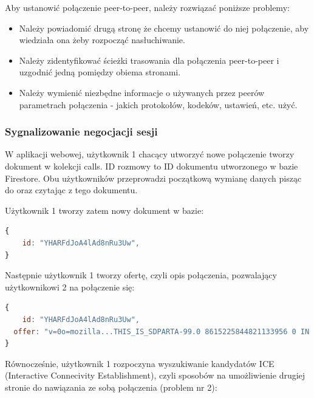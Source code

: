 Aby ustanowić połączenie peer-to-peer, należy rozwiązać poniższe problemy: \cite{hpbn}

\begin{itemize}
  \item Należy powiadomić drugą stronę że chcemy ustanowić do niej połączenie, aby wiedziała ona żeby rozpocząć
        nasłuchiwanie.
  \item Należy zidentyfikować ścieżki trasowania dla połączenia peer-to-peer i uzgodnić jedną pomiędzy obiema stronami.
  \item Należy wymienić niezbędne informacje o używanych przez peerów parametrach połączenia - jakich protokołów,
        kodeków, ustawień, etc. użyć.
\end{itemize}

\subsubsection{Sygnalizowanie negocjacji sesji}

W aplikacji webowej, użytkownik 1 chacący utworzyć nowe połączenie tworzy dokument w kolekcji calls. ID rozmowy to ID
dokumentu utworzonego w bazie Firestore. Obu użytkowników przeprowadzi początkową wymianę danych pisząc do oraz czytając
z tego dokumentu.

Użytkownik 1 tworzy zatem nowy dokument w bazie:

\begin{lstlisting}[language=Javascript,label=list:call-doc-1, caption=Dokument połączenia po utworzeniu przez użytkownika 1,
basicstyle=\footnotesize \ttfamily, showtabs=true, tabsize=4]
{
	id: "YHARFdJoA4lAd8nRu3Uw",
}
\end{lstlisting}

Następnie użytkownik 1 tworzy ofertę, czyli opis połączenia, pozwalający użytkownikowi 2 na połączenie się:

\begin{lstlisting}[language=Javascript,label=list:call-doc-2, caption=Dokument połączenia po dodaniu opisu sesji w protokole SDP,
basicstyle=\footnotesize \ttfamily, showtabs=true, tabsize=4]
{
	id: "YHARFdJoA4lAd8nRu3Uw",
  offer: "v=0o=mozilla...THIS_IS_SDPARTA-99.0 8615225844821133956 0 IN IP4 0.0.0.0s=-t=0 0a=fingerprint:sha-256 5F:A8:8A:A5:B8:1D:0C:39:21:93:FA:3A:B2:B7:B6:3F:EF:8A:5D:3C:6E:86:2E:A7:0A:D4:F0:E3:58:E0:E2:7B..."
}
\end{lstlisting}

Równocześnie, użytkownik 1 rozpoczyna wyszukiwanie kandydatów ICE (Interactive Connecivity Establishment), czyli
sposobów na umożliwienie drugiej stronie do nawiązania ze sobą połączenia (problem nr 2):

